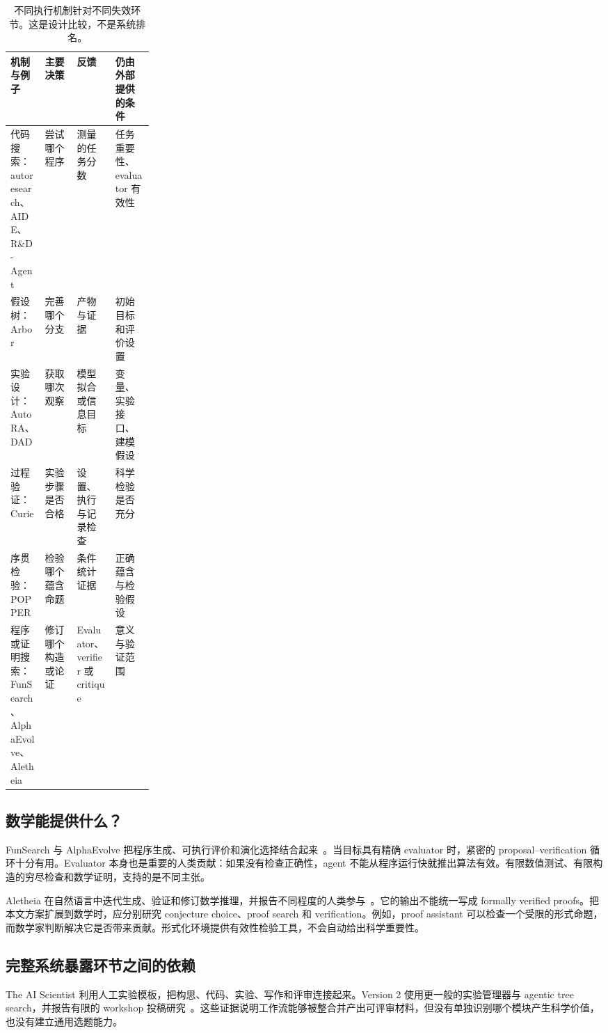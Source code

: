 \begin{table}[tbp]
\centering\small
\caption{不同执行机制针对不同失效环节。这是设计比较，不是系统排名。}
\label{tab:execution}
\begin{tabularx}{\linewidth}{@{}P{0.24\linewidth}YYY@{}}
\toprule
机制与例子 & 主要决策 & 反馈 & 仍由外部提供的条件\\
\midrule
代码搜索：autoresearch、AIDE、R\&D-Agent & 尝试哪个程序 & 测量的任务分数 & 任务重要性、evaluator 有效性\\
假设树：Arbor & 完善哪个分支 & 产物与证据 & 初始目标和评价设置\\
实验设计：AutoRA、DAD & 获取哪次观察 & 模型拟合或信息目标 & 变量、实验接口、建模假设\\
过程验证：Curie & 实验步骤是否合格 & 设置、执行与记录检查 & 科学检验是否充分\\
序贯检验：POPPER & 检验哪个蕴含命题 & 条件统计证据 & 正确蕴含与检验假设\\
程序或证明搜索：FunSearch、AlphaEvolve、Aletheia & 修订哪个构造或论证 & Evaluator、verifier 或 critique & 意义与验证范围\\
\bottomrule
\end{tabularx}
\end{table}

\subsection{数学能提供什么？}

FunSearch 与 AlphaEvolve 把程序生成、可执行评价和演化选择结合起来~\cite{funsearch,alphaevolve}。当目标具有精确 evaluator 时，紧密的 proposal--verification 循环十分有用。Evaluator 本身也是重要的人类贡献：如果没有检查正确性，agent 不能从程序运行快就推出算法有效。有限数值测试、有限构造的穷尽检查和数学证明，支持的是不同主张。

Aletheia 在自然语言中迭代生成、验证和修订数学推理，并报告不同程度的人类参与~\cite{aletheia}。它的输出不能统一写成 formally verified proofs。把本文方案扩展到数学时，应分别研究 conjecture choice、proof search 和 verification。例如，proof assistant 可以检查一个受限的形式命题，而数学家判断解决它是否带来贡献。形式化环境提供有效性检验工具，不会自动给出科学重要性。

\subsection{完整系统暴露环节之间的依赖}

The AI Scientist 利用人工实验模板，把构思、代码、实验、写作和评审连接起来。Version 2 使用更一般的实验管理器与 agentic tree search，并报告有限的 workshop 投稿研究~\cite{ai-scientist,ai-scientist-v2}。这些证据说明工作流能够被整合并产出可评审材料，但没有单独识别哪个模块产生科学价值，也没有建立通用选题能力。

